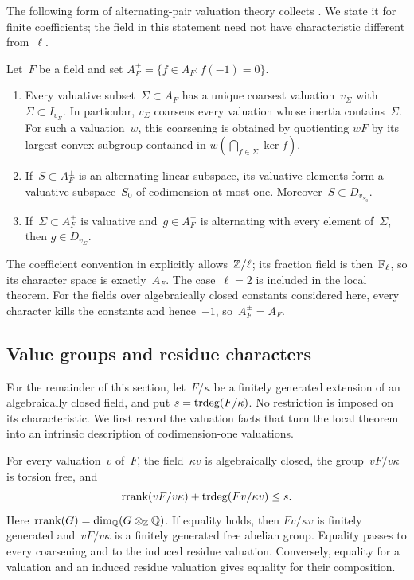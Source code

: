The following form of alternating-pair valuation theory collects
\cite[Fact~2.1, Lemma~2.5, Theorem~2.6, and Corollary~2.7]{Topaz2020}.
We state it for finite coefficients; the field in this statement need
not have characteristic different from~\(\ell\).

\begin{theorem}
\label{thm:local-input}
Let~\(F\) be a field and set
\(A_F^{\pm}=\{f\in A_F:f(-1)=0\}\).
\begin{enumerate}
\item Every valuative subset~\(\Sigma\subset A_F\) has a unique coarsest
valuation~\(v_\Sigma\) with~\(\Sigma\subset I_{v_\Sigma}\).  In particular,
\(v_\Sigma\) coarsens every valuation whose inertia contains~\(\Sigma\).
For such a valuation~\(w\), this coarsening is obtained by quotienting
\(wF\) by its largest convex subgroup contained in
\(w(\bigcap_{f\in\Sigma}\ker f)\).
\item If~\(S\subset A_F^{\pm}\) is an alternating linear subspace, its
valuative elements form a valuative subspace~\(S_0\) of codimension at
most one.  Moreover~\(S\subset D_{v_{S_0}}\).
\item If~\(\Sigma\subset A_F^{\pm}\) is valuative and~\(g\in A_F^{\pm}\)
is alternating with every element of~\(\Sigma\), then
\(g\in D_{v_\Sigma}\).
\end{enumerate}
\end{theorem}

The coefficient convention in \cite[Section~2.1]{Topaz2020} explicitly
allows~\(\mathbb Z/\ell\); its fraction field is then~\(\mathbb F_\ell\), so its
character space is exactly~\(A_F\).  The case~\(\ell=2\) is included
in the local theorem.  For the fields over algebraically closed
constants considered here, every character kills the constants and
hence~\(-1\), so~\(A_F^{\pm}=A_F\).

\subsection{Value groups and residue characters}

For the remainder of this section, let~\(F/\kappa\) be a finitely
generated extension of an algebraically closed field, and put
\(s=\operatorname{trdeg}(F/\kappa)\).  No restriction is imposed on its characteristic.
We first record the valuation facts that turn the local theorem into
an intrinsic description of codimension-one valuations.

\begin{lemma}
\label{lem:local-abhyankar}
For every valuation~\(v\) of~\(F\), the field~\(\kappa v\) is
algebraically closed, the group~\(vF/v\kappa\) is torsion free, and
\begin{equation}
 \operatorname{rrank}(vF/v\kappa)+\operatorname{trdeg}(Fv/\kappa v)\leq s.
 \label{eq:local-abhyankar}
\end{equation}
Here~\(\operatorname{rrank}(G)=\dim_\mathbb Q(G\otimes_\mathbb Z\mathbb Q)\).  If equality holds, then
\(Fv/\kappa v\) is finitely generated and~\(vF/v\kappa\) is a finitely
generated free abelian group.  Equality passes to every coarsening
and to the induced residue valuation.  Conversely, equality for a
valuation and an induced residue valuation gives equality for their
composition.
\end{lemma}

